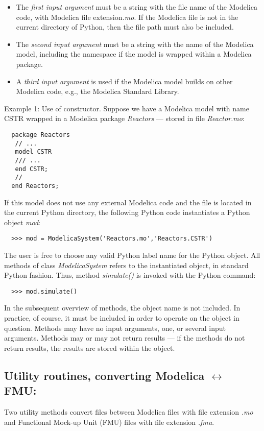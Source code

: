\begin{itemize}
	\item The \textit{first input argument} must be a string with the file name of the Modelica code, with Modelica file extension\textit{.mo}. If the 	 
	       Modelica file is not in the current directory of Python, then the file path must also be included.
	\item The \textit{second input argument} must be a string with the name of the Modelica model, including the namespace if the model is wrapped 
		  within a Modelica package.
	\item A \textit{third input argument} is used if the Modelica model builds on other Modelica code, e.g., the Modelica Standard Library.
\end{itemize}

Example 1: Use of constructor. Suppose we have a Modelica model with name CSTR wrapped in a Modelica package \textit{Reactors} — stored in file
\textit{Reactor.mo}:

\begin{lstlisting}
  package Reactors
   // ...
   model CSTR
   /// ...
   end CSTR;
   //
  end Reactors;
\end{lstlisting}

If this model does not use any external Modelica code and the file is located in the current Python directory, the following
Python code instantiates a Python object \textit{mod}:

\begin{lstlisting}
  >>> mod = ModelicaSystem('Reactors.mo','Reactors.CSTR')
\end{lstlisting}

The user is free to choose any valid Python label name for the Python object. All methods of class \textit{ModelicaSystem} refers to the instantiated object, in standard Python fashion. Thus, method \textit{simulate()} is invoked with the Python command:

\begin{lstlisting}
  >>> mod.simulate()
\end{lstlisting}

In the subsequent overview of methods, the object name is not included. In practice, of course, it must be included in order
to operate on the object in question. Methods may have no input arguments, one, or several input arguments. Methods may or may not return results — if the methods do not return results, the results are stored within the object.

\subsection{Utility routines, converting Modelica $\leftrightarrow$ FMU:}
\label{subsec:pythonmodelicafmu}
Two utility methods convert files between Modelica files with file extension \textit{.mo} and Functional Mock-up Unit (FMU) files with
file extension \textit{.fmu}.

